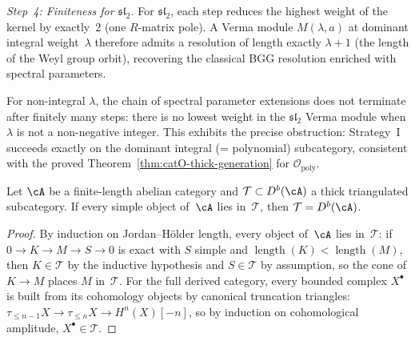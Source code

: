 \begin{computation}
\emph{Step~4: Finiteness for $\mathfrak{sl}_2$.}
For $\mathfrak{sl}_2$, each step reduces the highest weight of the
kernel by exactly~$2$ (one $R$-matrix pole).  A Verma module
$M(\lambda, a)$ at dominant integral weight~$\lambda$ therefore
admits a resolution of length exactly $\lambda + 1$ (the length of
the Weyl group orbit), recovering the classical BGG resolution
enriched with spectral parameters.

For non-integral $\lambda$, the chain of spectral parameter
extensions does not terminate after finitely many steps: there is no
lowest weight in the $\mathfrak{sl}_2$ Verma module when $\lambda$
is not a non-negative integer.  This exhibits the precise
obstruction: Strategy~I succeeds exactly on the dominant integral
(= polynomial) subcategory, consistent with the proved
Theorem~\ref{thm:catO-thick-generation} for
$\mathcal{O}_{\mathrm{poly}}$.
\end{computation}

\begin{proposition}
\label{prop:heart-capture-criterion}
Let $\cA$ be a finite-length abelian category and
$\mathcal{T} \subset D^b(\cA)$ a thick triangulated subcategory.
If every simple object of~$\cA$ lies in~$\mathcal{T}$, then
$\mathcal{T} = D^b(\cA)$.
\end{proposition}
\begin{proof}
By induction on Jordan--H\"older length, every object
of~$\cA$ lies in~$\mathcal{T}$: if $0 \to K \to M \to S \to 0$
is exact with $S$ simple and $\operatorname{length}(K) < \operatorname{length}(M)$,
then $K \in \mathcal{T}$ by the inductive hypothesis and $S \in \mathcal{T}$
by assumption, so the cone of $K \to M$ places $M$ in~$\mathcal{T}$.
For the full derived category, every bounded complex
$X^\bullet$ is built from its cohomology objects by canonical
truncation triangles: $\tau_{\leq n-1}X \to \tau_{\leq n}X \to H^n(X)[-n]$,
so by induction on cohomological amplitude, $X^\bullet \in \mathcal{T}$.
\end{proof}


